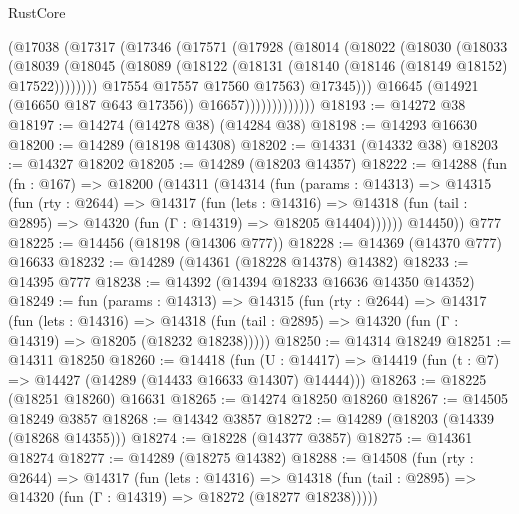 \begin{lexlean}{RustCore}
\begin{coremodule}
                      (@17038
                        (@17317
                          (@17346
                            (@17571
                              (@17928
                                (@18014
                                  (@18022
                                    (@18030
                                      (@18033
                                        (@18039
                                          (@18045
                                            (@18089
                                              (@18122
                                                (@18131
                                                  (@18140 (@18146 (@18149 @18152) @17522))))))))
                                      @17554
                                      @17557
                                      @17560
                                      @17563)
                                    @17345)))
                              @16645
                              (@14921 (@16650 @187 @643 @17356))
                              @16657)))))))))))))
@18193 := @14272 @38
@18197 := @14274 (@14278 @38) (@14284 @38)
@18198 := @14293 @16630
@18200 := @14289 (@18198 @14308)
@18202 := @14331 (@14332 @38)
@18203 := @14327 @18202
@18205 := @14289 (@18203 @14357)
@18222 := @14288
    (fun (fn : @167) =>
    @18200
      (@14311
        (@14314
          (fun (params : @14313) =>
          @14315
            (fun (rty : @2644) =>
            @14317
              (fun (lets : @14316) =>
              @14318 (fun (tail : @2895) => @14320 (fun (Γ : @14319) => @18205 @14404))))))
        @14450))
    @777
@18225 := @14456 (@18198 (@14306 @777))
@18228 := @14369 (@14370 @777) @16633
@18232 := @14289 (@14361 (@18228 @14378) @14382)
@18233 := @14395 @777
@18238 := @14392 (@14394 @18233 @16636 @14350 @14352)
@18249 := fun (params : @14313) =>
  @14315
    (fun (rty : @2644) =>
    @14317
      (fun (lets : @14316) =>
      @14318 (fun (tail : @2895) => @14320 (fun (Γ : @14319) => @18205 (@18232 @18238)))))
@18250 := @14314 @18249
@18251 := @14311 @18250
@18260 := @14418
    (fun (U : @14417) => @14419 (fun (t : @7) => @14427 (@14289 (@14433 @16633 @14307) @14444)))
@18263 := @18225 (@18251 @18260) @16631
@18265 := @14274 @18250 @18260
@18267 := @14505 @18249 @3857
@18268 := @14342 @3857
@18272 := @14289 (@18203 (@14339 (@18268 @14355)))
@18274 := @18228 (@14377 @3857)
@18275 := @14361 @18274
@18277 := @14289 (@18275 @14382)
@18288 := @14508
    (fun (rty : @2644) =>
    @14317
      (fun (lets : @14316) =>
      @14318 (fun (tail : @2895) => @14320 (fun (Γ : @14319) => @18272 (@18277 @18238)))))

\end{coremodule}
\end{lexlean}
